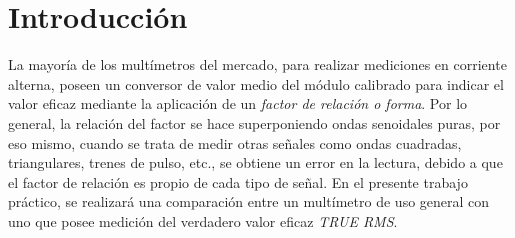   \section{Introducción}
    La mayoría de los multímetros del mercado, para realizar mediciones
    en corriente alterna, poseen un conversor de valor medio del módulo 
    calibrado para indicar el valor eficaz mediante la aplicación de 
    un \textit{factor de relación o forma}. Por lo general, la relación del factor 
    se hace superponiendo ondas senoidales puras, por eso mismo, cuando se trata de medir 
    otras señales como ondas cuadradas, triangulares, trenes de pulso, etc.,
    se obtiene un error en la lectura, debido a que el factor de relación 
    es propio de cada tipo de señal. En el presente trabajo práctico, 
    se realizará una comparación entre un multímetro de uso general con uno
    que posee medición del verdadero valor eficaz \textit{TRUE RMS}. 
       